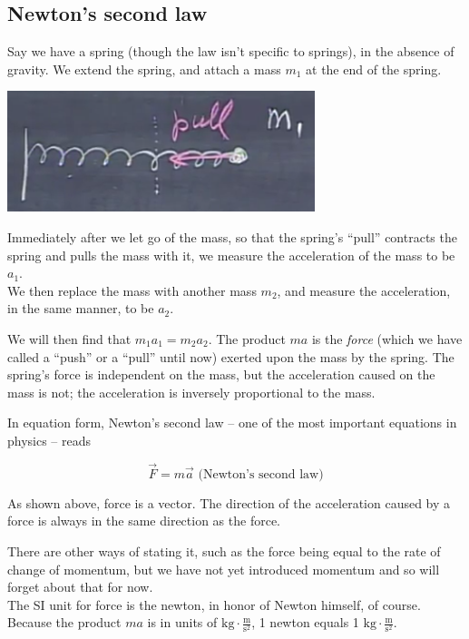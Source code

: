 \documentclass[12pt,a4paper]{report}
\begin{document}
\subsection{Newton's second law}

Say we have a spring (though the law isn't specific to springs), in the absence of gravity. We extend the spring, and attach a mass $m_1$ at the end of the spring.

\begin{center}
\includegraphics[scale=0.6]{Graphics/lec6_newton2}
\end{center}

Immediately after we let go of the mass, so that the spring's ``pull'' contracts the spring and pulls the mass with it, we measure the acceleration of the mass to be $a_1$.\\
We then replace the mass with another mass $m_2$, and measure the acceleration, in the same manner, to be $a_2$.

We will then find that $m_1 a_1 = m_2 a_2$. The product $m a$ is the \emph{force} (which we have called a ``push'' or a ``pull'' until now) exerted upon the mass by the spring. The spring's force is independent on the mass, but the acceleration caused on the mass is not; the acceleration is inversely proportional to the mass.

In equation form, Newton's second law -- one of the most important equations in physics -- reads

\begin{equation}
\vec{F} = m \vec{a} \text{ (Newton's second law)} \label{eq:newton2}
\end{equation}

As shown above, force is a vector. The direction of the acceleration caused by a force is always in the same direction as the force.

There are other ways of stating it, such as the force being equal to the rate of change of momentum, but we have not yet introduced momentum and so will forget about that for now.\\
The SI unit for force is the newton, in honor of Newton himself, of course. Because the product $m a$ is in units of $\displaystyle \text{kg} \cdot \frac{\text{m}}{\text{s}^2}$, 1 newton equals 1 $\displaystyle \text{kg} \cdot \frac{\text{m}}{\text{s}^2}$.
\end{document}
